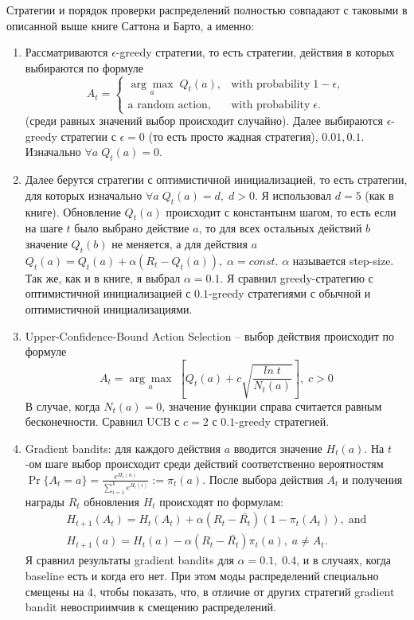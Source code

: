\documentclass{article}
\begin{document}
Стратегии и порядок проверки распределений полностью совпадают с таковыми в описанной выше книге Саттона и Барто, а именно:
\begin{enumerate}
    \item Рассматриваются $\epsilon$-greedy стратегии, то есть стратегии, действия в которых выбираются по формуле
    $$A_t = \begin{cases}
            \underset{a}{\arg \max} \; Q_t(a), & \text{with probability} \; 1 - \epsilon, \\
            \text{a random action}, & \text{with probability} \; \epsilon.
            \end{cases}$$ 
    (среди равных значений выбор происходит случайно). Далее выбираются $\epsilon$-greedy стратегии с $\epsilon = 0$ (то есть просто жадная стратегия), $0.01, 0.1$. Изначально $\forall a \; Q_t(a) = 0$.
    \item Далее берутся стратегии с оптимистичной инициализацией, то есть стратегии, для которых изначально $\forall a \; Q_t(a) = d, \; d > 0$. Я использовал $d=5$ (как в книге). Обновление $Q_t(a)$ происходит с константынм шагом, то есть если на шаге $t$ было выбрано действие $a$, то для всех остальных действий $b$ значение $Q_t(b)$ не меняется, а для действия $a$ $Q_t(a) = Q_t(a) + \alpha (R_t - Q_t(a)), \; \alpha = const$. $\alpha$ называется step-size. Так же, как и в книге, я выбрал $\alpha = 0.1$. Я сравнил greedy-стратегию с оптимистичной инициализацией с $0.1$-greedy стратегиями с обычной и оптимистичной инициализациями.
    \item Upper-Confidence-Bound Action Selection -- выбор действия происходит по формуле 
    $$A_t = \underset{a}{\arg \max} \; \left[ Q_t(a) + c \sqrt{\frac{ln \; t}{N_t(a)}} \right], \; c > 0$$
    В случае, когда $N_t(a) = 0$, значение функции справа считается равным бесконечности. Сравнил UCB с $c = 2$ с $0.1$-greedy стратегией.
    \item Gradient bandits: для каждого действия $a$ вводится значение $H_t(a)$. На $t$-ом шаге выбор происходит среди действий соответственно вероятностям $\Pr\{A_t = a\} = \frac{e^{H_t(a)}}{\sum_{i=1}^{k} e^{H_t(i)}} := \pi_t(a)$. После выбора действия $A_t$ и получения награды $R_t$ обновления $H_t$ происходят по формулам:
    $$\begin{aligned}
      H_{t+1}(A_t) = H_t(A_t) + \alpha (R_t - \bar{R_t}) (1 - \pi_t(A_t)), \; \text{and} \\ 
      H_{t+1}(a) = H_t(a) - \alpha (R_t - \bar{R_t})\pi_t(a), \; a \neq A_t.
      \end{aligned}$$
    Я сравнил результаты gradient bandits для $\alpha = 0.1, \; 0.4$, и в случаях, когда baseline есть и когда его нет. При этом моды распределений специально смещены на 4, чтобы показать, что, в отличие от других стратегий gradient bandit невосприимчив к смещению распределений.
\end{enumerate}
\end{document}
